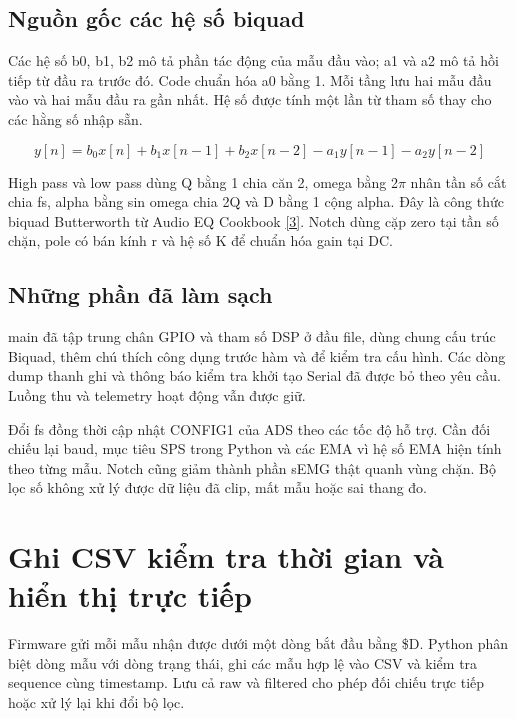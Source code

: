 \documentclass[12pt,letterpaper]{article}
\begin{document}
\subsection*{Nguồn gốc các hệ số biquad}

Các hệ số b0, b1, b2 mô tả phần tác động của mẫu đầu vào; a1 và a2 mô tả hồi tiếp từ đầu ra trước đó. Code chuẩn hóa a0 bằng 1. Mỗi tầng lưu hai mẫu đầu vào và hai mẫu đầu ra gần nhất. Hệ số được tính một lần từ tham số thay cho các hằng số nhập sẵn.


\[y[n]=b_0x[n]+b_1x[n-1]+b_2x[n-2]-a_1y[n-1]-a_2y[n-2]\]

High pass và low pass dùng Q bằng 1 chia căn 2, omega bằng 2\ensuremath{\pi} nhân tần số cắt chia fs, alpha bằng sin omega chia 2Q và D bằng 1 cộng alpha. Đây là công thức biquad Butterworth từ Audio EQ Cookbook \hyperlink{ref3}{[3]}. Notch dùng cặp zero tại tần số chặn, pole có bán kính r và hệ số K để chuẩn hóa gain tại DC.


\subsection*{Những phần đã làm sạch}

main đã tập trung chân GPIO và tham số DSP ở đầu file, dùng chung cấu trúc Biquad, thêm chú thích công dụng trước hàm và  để kiểm tra cấu hình. Các dòng dump thanh ghi và thông báo kiểm tra khởi tạo Serial đã được bỏ theo yêu cầu. Luồng thu và telemetry hoạt động vẫn được giữ.


Đổi fs đồng thời cập nhật CONFIG1 của ADS theo các tốc độ hỗ trợ. Cần đối chiếu lại baud, mục tiêu SPS trong Python và các EMA vì hệ số EMA hiện tính theo từng mẫu. Notch cũng giảm thành phần sEMG thật quanh vùng chặn. Bộ lọc số không xử lý được dữ liệu đã clip, mất mẫu hoặc sai thang đo.





\clearpage

\section{Ghi CSV kiểm tra thời gian và hiển thị trực tiếp}

Firmware gửi mỗi mẫu nhận được dưới một dòng bắt đầu bằng \$D. Python phân biệt dòng mẫu với dòng trạng thái, ghi các mẫu hợp lệ vào CSV và kiểm tra sequence cùng timestamp. Lưu cả raw và filtered cho phép đối chiếu trực tiếp hoặc xử lý lại khi đổi bộ lọc.
\end{document}

